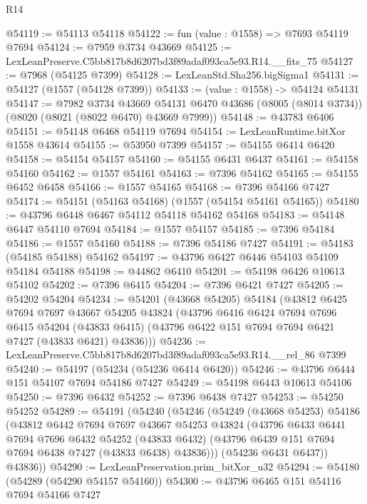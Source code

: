 \begin{lexlean}{R14}
\begin{coremodule}
@54119 := @54113 @54118
@54122 := fun (value : @1558) => @7693 @54119 @7694
@54124 := @7959 @3734 @43669
@54125 := LexLeanPreserve.C5bb817b8d6207bd3f89adaf093ca5e93.R14.__fits_75
@54127 := @7968 (@54125 @7399)
@54128 := LexLeanStd.Sha256.bigSigma1
@54131 := @54127 (@1557 (@54128 @7399))
@54133 := (value : @1558) -> @54124 @54131
@54147 := @7982
    @3734
    @43669
    @54131
    @6470
    @43686
    (@8005 (@8014 @3734))
    (@8020 (@8021 (@8022 @6470) @43669 @7999))
@54148 := @43783 @6406
@54151 := @54148 @6468 @54119 @7694
@54154 := LexLeanRuntime.bitXor @1558 @43614
@54155 := @53950 @7399
@54157 := @54155 @6414 @6420
@54158 := @54154 @54157
@54160 := @54155 @6431 @6437
@54161 := @54158 @54160
@54162 := @1557 @54161
@54163 := @7396 @54162
@54165 := @54155 @6452 @6458
@54166 := @1557 @54165
@54168 := @7396 @54166 @7427
@54174 := @54151 (@54163 @54168) (@1557 (@54154 @54161 @54165))
@54180 := @43796 @6448 @6467 @54112 @54118 @54162 @54168
@54183 := @54148 @6447 @54110 @7694
@54184 := @1557 @54157
@54185 := @7396 @54184
@54186 := @1557 @54160
@54188 := @7396 @54186 @7427
@54191 := @54183 (@54185 @54188) @54162
@54197 := @43796 @6427 @6446 @54103 @54109 @54184 @54188
@54198 := @44862 @6410
@54201 := @54198 @6426 @10613 @54102
@54202 := @7396 @6415
@54204 := @7396 @6421 @7427
@54205 := @54202 @54204
@54234 := @54201
    (@43668 @54205)
    @54184
    (@43812
      @6425
      @7694
      @7697
      @43667
      @54205
      @43824
      (@43796
        @6416
        @6424
        @7694
        @7696
        @6415
        @54204
        (@43833 @6415)
        (@43796 @6422 @151 @7694 @7694 @6421 @7427 (@43833 @6421) @43836)))
@54236 := LexLeanPreserve.C5bb817b8d6207bd3f89adaf093ca5e93.R14.__rel_86 @7399
@54240 := @54197 (@54234 (@54236 @6414 @6420))
@54246 := @43796 @6444 @151 @54107 @7694 @54186 @7427
@54249 := @54198 @6443 @10613 @54106
@54250 := @7396 @6432
@54252 := @7396 @6438 @7427
@54253 := @54250 @54252
@54289 := @54191
    (@54240
      (@54246
        (@54249
          (@43668 @54253)
          @54186
          (@43812
            @6442
            @7694
            @7697
            @43667
            @54253
            @43824
            (@43796
              @6433
              @6441
              @7694
              @7696
              @6432
              @54252
              (@43833 @6432)
              (@43796 @6439 @151 @7694 @7694 @6438 @7427 (@43833 @6438) @43836)))
          (@54236 @6431 @6437))
        @43836))
@54290 := LexLeanPreservation.prim_bitXor_u32
@54294 := @54180 (@54289 (@54290 @54157 @54160))
@54300 := @43796 @6465 @151 @54116 @7694 @54166 @7427

\end{coremodule}
\end{lexlean}
